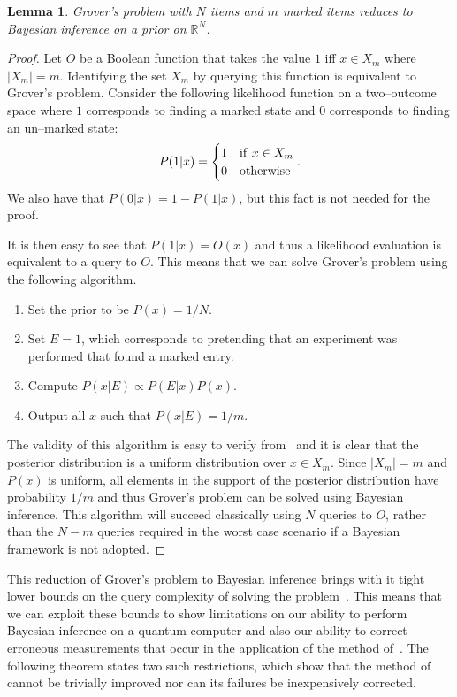 \documentclass[aps,amsmath,onecolumn,amssymb]{revtex4}
\newtheorem{lemma}{Lemma}
\begin{document}
\begin{lemma}\label{lem:reduce}
Grover's problem with $N$ items and $m$ marked items reduces to Bayesian inference on a prior on $\mathbb{R}^N$.
\end{lemma}
\begin{proof}
Let $O$ be a Boolean function that takes the value $1$ iff $x\in X_m$ where $|X_m|=m$.  Identifying the set $X_m$ by querying this function is equivalent to Grover's problem.  Consider the following likelihood function on a two--outcome space where $1$ corresponds to finding a marked state and $0$ corresponds to finding an un--marked state:
\begin{equation}
P(1|x) = \begin{cases} 1 & {\rm if~}x\in X_m\\ 0& {\rm otherwise} \end{cases}.\label{eq:reduceLikelihood}
\end{equation}
We also have that $P(0|x)=1-P(1|x)$, but this fact is not needed for the proof.

It is then easy to see that $P(1|x)=O(x)$ and thus a likelihood evaluation is equivalent to a query to $O$.  This means that we can solve Grover's problem using the following algorithm.  \begin{enumerate}
\item Set the prior to be $P(x) = 1/N$.
\item Set $E=1$, which corresponds to pretending that an experiment was performed that found a marked entry.  
\item Compute $P(x|E) \propto P(E|x)P(x)$.  
\item Output all $x$ such that $P(x|E)=1/m$.
\end{enumerate}

The validity of this algorithm is easy to verify from~ and it is clear that the posterior distribution is a uniform distribution over $x\in X_m$.  Since $|X_m|=m$ and $P(x)$ is uniform, all elements in the support of the posterior distribution have probability $1/m$ and thus Grover's problem can be solved using Bayesian inference.  This algorithm will succeed classically using $N$ queries to $O$, rather than the $N-m$ queries required in the worst case scenario if a Bayesian framework is not adopted.


\end{proof}

This reduction of Grover's problem to Bayesian inference brings with it tight lower bounds on the query complexity of solving the problem~\cite{BGH+96}.  This means that we can exploit these bounds to show limitations on our ability to perform Bayesian inference on a quantum computer and also our ability to correct erroneous measurements that occur in the application of the method of~.  The following theorem states two such restrictions, which show that the method of~ cannot be trivially improved nor can its failures be inexpensively corrected.
\end{document}
